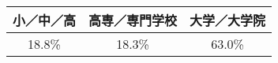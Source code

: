 
\begin{tabular}{c|c|c}
\hline
小／中／高 & 高専／専門学校 & 大学／大学院\\
\hline
18.8\% & 18.3\% & 63.0\%\\
\hline
\end{tabular}
